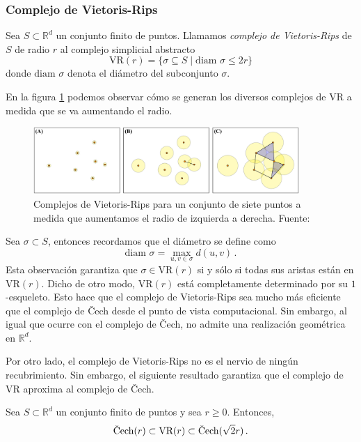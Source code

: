 \subsubsection*{Complejo de Vietoris-Rips}

\begin{definition}
Sea $S \subset \mathbb{R}^d$ un conjunto finito de puntos. Llamamos \emph{complejo de Vietoris-Rips} de $S$ de radio $r$ al complejo simplicial abstracto
\[
\text{VR}(r) = \{\sigma \subseteq  S \mid \textrm{diam } \sigma \leq 2r\}
\]
donde $\textrm{diam } \sigma$ denota el diámetro del subconjunto $\sigma$.
\end{definition}

En la figura \ref{ref:vr} podemos observar cómo se generan los diversos complejos de VR a medida que se va aumentando el radio.

\begin{figure}[!ht]
\centering
\includegraphics[width=0.9\textwidth]{include/figuras/vr.png} 
\caption{Complejos de Vietoris-Rips para un conjunto de siete puntos a medida que aumentamos el radio de izquierda a derecha. Fuente: \cite{Ulmer2019}}
\label{ref:vr}
\end{figure}


Sea $\sigma \subset S$, entonces recordamos que el diámetro se define como
\[\textrm{diam } \sigma = \max_{u, v \in \sigma} d(u,v)\,.\]
Esta observación garantiza que $\sigma \in \text{VR}(r)$ si y sólo si todas sus aristas están en $\text{VR}(r)$. Dicho de otro modo, $\text{VR}(r)$ está completamente determinado por su $1$-esqueleto. Esto hace que el complejo de Vietoris-Rips sea mucho más eficiente que el complejo de \v{C}ech desde el punto de vista computacional. Sin embargo, al igual que ocurre con el complejo de \v{C}ech, no admite una realización geométrica en $\mathbb{R}^d$.

Por otro lado, el complejo de Vietoris-Rips no es el nervio de ningún recubrimiento. Sin embargo, el siguiente resultado garantiza que el complejo de VR aproxima al complejo de \v{C}ech.

\begin{lemma}
\label{ref:lemaVR}
Sea $S \subset \mathbb{R}^d$ un conjunto finito de puntos y sea $r \geq 0$. Entonces,
\[
\text{\rm \v{C}ech}(r) \subset \text{\rm VR}(r) \subset \text{\rm \v{C}ech}(\sqrt{2}r)\,.
\]
\end{lemma}

